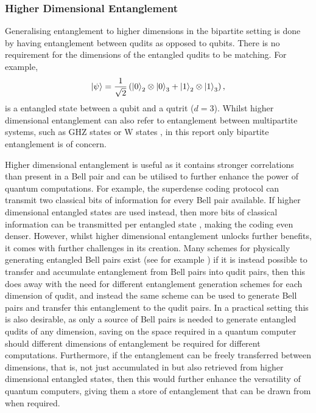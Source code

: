 \subsubsection{Higher Dimensional Entanglement}
Generalising entanglement to higher dimensions in the bipartite setting is done by having entanglement between qudits as opposed to qubits.
There is no requirement for the dimensions of the entangled qudits to be matching.
For example,
\begin{equation}
    \ket{\psi} = \frac{1}{\sqrt{2}}\left(\ket{0}_2\otimes\ket{0}_3 + \ket{1}_2\otimes\ket{1}_3\right),
\end{equation}
is a entangled state between a qubit and a qutrit ($d=3$).
Whilst higher dimensional entanglement can also refer to entanglement between multipartite systems, such as GHZ states or W states \cite{bengtsson2016brief}, in this report only bipartite entanglement is of concern.

Higher dimensional entanglement is useful as it contains stronger correlations than present in a Bell pair and can be utilised to further enhance the power of quantum computations.
For example, the superdense coding protocol can transmit two classical bits of information for every Bell pair available.
If higher dimensional entangled states are used instead, then more bits of classical information can be transmitted per entangled state \cite{Liu_2002}, making the coding even denser.
However, whilst higher dimensional entanglement unlocks further benefits, it comes with further challenges in its creation.
Many schemes for physically generating entangled Bell pairs exist (see for example \cite{Browne_2003, Wei_2006, Messina_2002}) if it is instead possible to transfer and accumulate entanglement from Bell pairs into qudit pairs, then this does away with the need for different entanglement generation schemes for each dimension of qudit, and instead the same scheme can be used to generate Bell pairs and transfer this entanglement to the qudit pairs.
In a practical setting this is also desirable, as only a source of Bell pairs is needed to generate entangled qudits of any dimension, saving on the space required in a quantum computer should different dimensions of entanglement be required for different computations.
Furthermore, if the entanglement can be freely transferred between dimensions, that is, not just accumulated in but also retrieved from higher dimensional entangled states, then this would further enhance the versatility of quantum computers, giving them a store of entanglement that can be drawn from when required.

